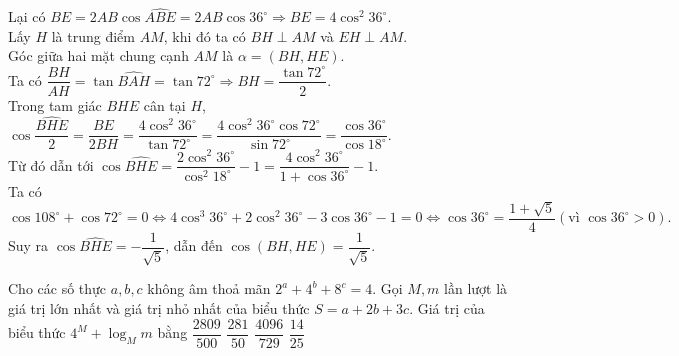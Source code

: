 \begin{ex}
{{
}
\noindent Lại có $BE=2AB\cos \widehat{ABE}=2AB\cos 36^\circ\Rightarrow BE=4\cos^2 36^\circ$.\\
Lấy $H$ là trung điểm $AM$, khi đó ta có $BH\perp AM$ và $EH\perp AM$.\\
Góc giữa hai mặt chung cạnh $AM$ là $\alpha=(BH,HE)$.\\
Ta có $\dfrac{BH}{AH}=\tan \widehat{BAH}=\tan 72^\circ\Rightarrow BH=\dfrac{\tan 72^\circ}{2}$.\\
Trong tam giác $BHE$ cân tại $H$, $\cos\dfrac{\widehat{BHE}}{2}=\dfrac{BE}{2BH}=\dfrac{4\cos^2 36^\circ}{\tan 72^\circ}=\dfrac{4\cos^2 36^\circ\cos 72^\circ}{\sin 72^\circ}=\dfrac{\cos 36^\circ}{\cos 18^\circ}$.\\
Từ đó dẫn tới $\cos\widehat{BHE}=\dfrac{2\cos^2 36^\circ}{\cos^2 18^\circ}-1=\dfrac{4\cos^2 36^\circ}{1+\cos 36^\circ}-1$.\\
Ta có $$\cos 108^\circ+\cos 72^\circ=0 \Leftrightarrow 4\cos^3 36^\circ+2\cos^2 36^\circ-3\cos 36^\circ-1=0 \Leftrightarrow \cos 36^\circ=\dfrac{1+\sqrt{5}}{4} (\text{vì }\cos 36^\circ>0).$$
Suy ra $\cos \widehat{BHE}=-\dfrac{1}{\sqrt{5}}$, dẫn đến $\cos (BH,HE)=\dfrac{1}{\sqrt{5}}$.
}
\end{ex}

\begin{ex}%
Cho các số thực $a,b,c$ không âm thoả mãn $2^a+4^b+8^c=4$. Gọi $M,m$ lần lượt là giá trị lớn nhất và giá trị nhỏ nhất của biểu thức $S=a+2b+3c$. Giá trị của biểu thức $4^M+\log_M m$ bằng
\choice
{$\dfrac{2809}{500}$}
{$\dfrac{281}{50}$}
{\True $\dfrac{4096}{729}$}
{$\dfrac{14}{25}$}
\end{ex}

